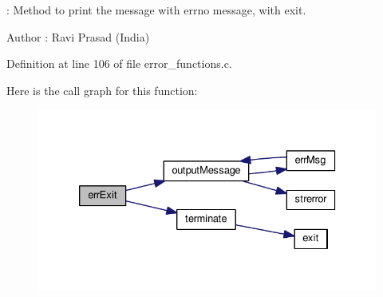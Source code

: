 \-: Method to print the message with errno message, with exit. 

\begin{DoxyAuthor}{Author}
\-: Ravi Prasad (India) 
\end{DoxyAuthor}


Definition at line 106 of file error\-\_\-functions.\-c.



Here is the call graph for this function\-:
\nopagebreak
\begin{figure}[H]
\begin{center}
\leavevmode
\includegraphics[width=330pt]{d2/d3d/common_2README_a9353730adacb3417493e841dace8708b_cgraph}
\end{center}
\end{figure}


